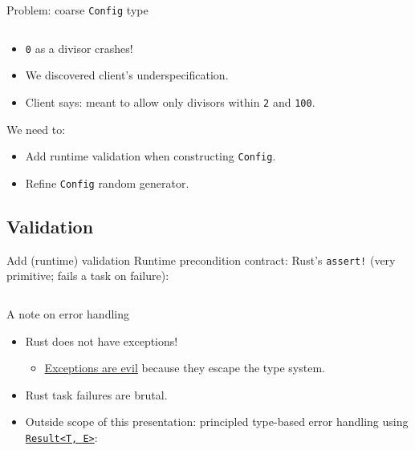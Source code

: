 \begin{frame}[fragile]{Problem: coarse \texttt{Config} type}
  \inputminted{console}{testQuick6.console}

  \begin{itemize}
  \item \texttt{0} as a divisor \alert{crashes}!
  \item We discovered client's \alert{underspecification}.
  \item Client says: meant to allow only divisors within \texttt{2} and \texttt{100}.
  \end{itemize}

  We need to:
  \begin{itemize}
  \item Add runtime \alert{validation} when \alert{constructing} \texttt{Config}.
  \item Refine \texttt{Config} random generator.
  \end{itemize}
\end{frame}

\subsection{Validation}

\begin{frame}[fragile]{Add (runtime) validation}
  \alert{Runtime} precondition contract: Rust's \texttt{assert!} (very primitive; fails a task on failure):

  \inputminted{rust}{FizzBuzz3Validate.rs}
\end{frame}

\begin{frame}{A note on error handling}
  \begin{itemize}
  \item \alert{Rust does not have exceptions}!
    \begin{itemize}
    \item \href{http://blog.jessitron.com/2013/06/whats-dirtier-than-comments-exceptions.html}{Exceptions are evil} because they escape the type system.
    \end{itemize}
  \item Rust task failures are brutal.
  \item Outside scope of this presentation: principled type-based error handling using \href{http://doc.rust-lang.org/std/result/}{\texttt{Result<T, E>}}: 
  \end{itemize}
\end{frame}

